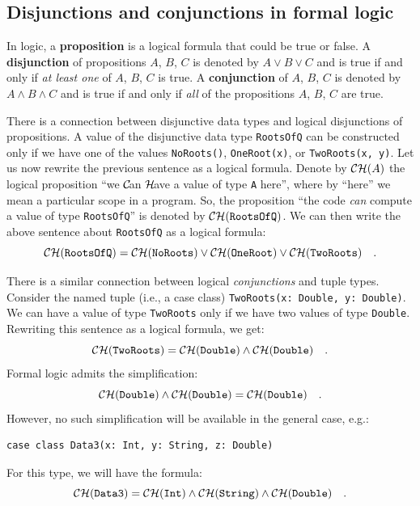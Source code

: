 \subsection{Disjunctions and conjunctions in formal logic\label{subsec:Disjunctions-and-conjunctions}}

In logic, a \textbf{proposition} is
a logical formula that could be true or false. A \textbf{disjunction}
of propositions $A$, $B$, $C$ is denoted by $A\vee B\vee C$ and
is true if and only if \emph{at least one} of $A$, $B$, $C$ is
true. A \textbf{conjunction} of $A$,
$B$, $C$ is denoted by $A\wedge B\wedge C$ and is true if and only
if \emph{all} of the propositions $A$, $B$, $C$ are true.

There is a connection between disjunctive data types and logical disjunctions
of propositions. A value of the disjunctive data type \lstinline!RootsOfQ!
can be constructed only if we have one of the values \lstinline!NoRoots()!,
\lstinline!OneRoot(x)!, or \lstinline!TwoRoots(x, y)!. Let us now
rewrite the previous sentence as a logical formula. Denote by ${\cal CH}(A)$
the logical proposition \textsf{``}we ${\cal C}\!$an ${\cal H}\!$ave a value
of type \lstinline!A! here\textsf{''}, where by \textsf{``}here\textsf{''} we mean a particular
scope in a program. So, the proposition \textsf{``}the code \emph{can} compute
a value of type \lstinline!RootsOfQ!\textsf{''} is denoted by ${\cal CH}(\text{\texttt{RootsOfQ}})$.
We can then write the above sentence about \lstinline!RootsOfQ! as
a logical formula:
\begin{equation}
{\cal CH}(\text{\texttt{RootsOfQ}})={\cal CH}(\text{\texttt{NoRoots}})\vee{\cal CH}(\text{\texttt{OneRoot}})\vee{\cal CH}(\text{\texttt{TwoRoots}})\quad.\label{eq:curry-howard-example-disjunction}
\end{equation}

There is a similar connection between logical \emph{conjunctions}
and tuple types. Consider the named tuple (i.e., a case class) \lstinline!TwoRoots(x: Double, y: Double)!.
We can have a value of type \lstinline!TwoRoots! only if we have
two values of type \lstinline!Double!. Rewriting this sentence as
a logical formula, we get:
\[
{\cal CH}(\text{\texttt{TwoRoots}})={\cal CH}(\text{\texttt{Double}})\wedge{\cal CH}(\text{\texttt{Double}})\quad.
\]
Formal logic admits the simplification:
\[
{\cal CH}(\text{\texttt{Double}})\wedge{\cal CH}(\text{\texttt{Double}})={\cal CH}(\text{\texttt{Double}})\quad.
\]
However, no such simplification will be available in the general case,
e.g.:
\begin{lstlisting}
case class Data3(x: Int, y: String, z: Double)
\end{lstlisting}
For this type, we will have the formula:
\begin{equation}
{\cal CH}(\text{\texttt{Data3}})={\cal CH}(\text{\texttt{Int}})\wedge{\cal CH}(\text{\texttt{String}})\wedge{\cal CH}(\text{\texttt{Double}})\quad.\label{eq:curry-howard-example-case-class}
\end{equation}

